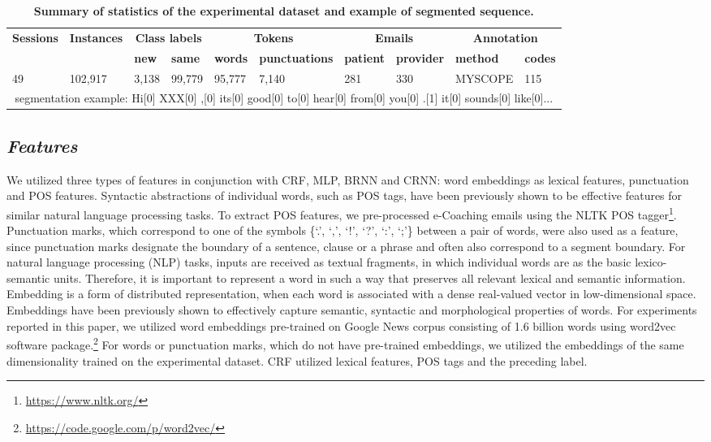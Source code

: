 \documentclass{amia}
\begin{document}
\begin{table}[ht]
\centering
\caption{\textbf{Summary of statistics of the experimental dataset and example of segmented sequence.}}
\label{tab:datastat}
 \begin{tabular}{|l|l|l|l|l|l|l|l|l|l|}
  \hline
   \multirow{2}{*}{\textbf{Sessions}} & \multirow{2}{*}{\textbf{Instances}} & \multicolumn{2}{|c|}{\textbf{Class labels}} & \multicolumn{2}{|c|}{\textbf{Tokens}} & \multicolumn{2}{|c|}{\textbf{Emails}} & \multicolumn{2}{|c|}{\textbf{Annotation}} \\\cline{3-10}
   &  & \textbf{new}  & \textbf{same} & \textbf{words} & \textbf{punctuations}  & \textbf{patient} & \textbf{provider} & \textbf{method}  & \textbf{codes} \\ \hline    
 49 & 102,917 & 3,138 & 99,779 & 95,777 & 7,140 & 281 & 330 & MYSCOPE & 115 \\ \hline
 \multicolumn{10}{|c|}{segmentation example: Hi[0] XXX[0] ,[0] its[0] good[0] to[0] hear[0] from[0] you[0] .[1] it[0] sounds[0] like[0]...} \\ \hline
  \end{tabular}
\end{table}     

\subsection*{\textit{Features}}
We utilized three types of features in conjunction with CRF, MLP, BRNN and CRNN: word embeddings as lexical features, punctuation and POS features. Syntactic abstractions of individual words, such as POS tags, have been previously shown to be effective features for similar natural language processing tasks.\cite{liu2005using,treviso2017sentence} To extract POS features, we pre-processed e-Coaching emails using the NLTK POS tagger\footnote{\url{https://www.nltk.org/}}. Punctuation marks, which correspond to one of the symbols \{`.', `,', `!', `?', `:', `;'\} between a pair of words, were also used as a feature, since punctuation marks designate the boundary of a sentence, clause or a phrase and often also correspond to a segment boundary.\cite{cho2002text} For natural language processing (NLP) tasks, inputs are received as textual fragments, in which individual words are as the basic lexico-semantic units. Therefore, it is important to represent a word in such a way that preserves all relevant lexical and semantic information. Embedding is a form of distributed representation, when each word is associated with a dense real-valued vector in low-dimensional space. Embeddings have been previously shown to effectively capture semantic, syntactic and morphological properties of words.\cite{pennington2014glove, mikolov2013distributed} For experiments reported in this paper, we utilized word embeddings pre-trained on Google News corpus consisting of 1.6 billion words using word2vec software package.\footnote{\label{fn:word2vec}\url{https://code.google.com/p/word2vec/}} For words or punctuation marks, which do not have pre-trained embeddings, we utilized the embeddings of the same dimensionality trained on the experimental dataset. CRF utilized lexical features, POS tags and the preceding label. 
\end{document}
